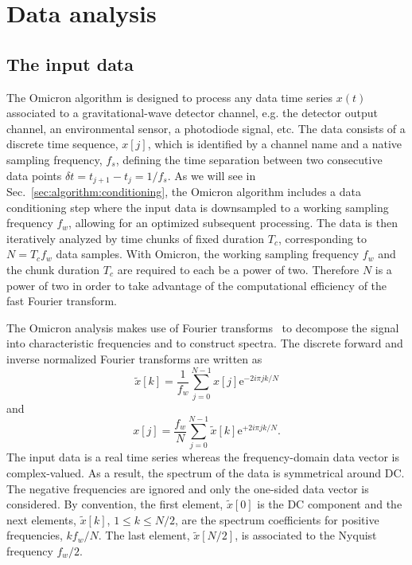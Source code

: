 \section{Data analysis} \label{sec:analysis}


\subsection{The input data} \label{sec:analysis:data}

The Omicron algorithm is designed to process any data time series $x(t)$ associated to a gravitational-wave detector channel, e.g. the detector output channel, an environmental sensor, a photodiode signal, etc. The data consists of a discrete time sequence, $x[j]$, which is identified by a channel name and a native sampling frequency, $f_s$, defining the time separation between two consecutive data points $\delta t = t_{j+1}-t_j = 1/f_s$. As we will see in Sec.~\ref{sec:algorithm:conditioning}, the Omicron algorithm includes a data conditioning step where the input data is downsampled to a working sampling frequency $f_w$, allowing for an optimized subsequent processing. The data is then iteratively analyzed by time chunks of fixed duration $T_c$, corresponding to $N=T_cf_w$ data samples. With Omicron, the working sampling frequency $f_w$ and the chunk duration $T_c$ are required to each be a power of two. Therefore $N$ is a power of two in order to take advantage of the computational efficiency of the fast Fourier transform.

The Omicron analysis makes use of Fourier transforms~\cite{Gabor:1946} to decompose the signal into characteristic frequencies and to construct spectra. The discrete forward and inverse normalized Fourier transforms are written as
\begin{equation}
  \tilde{x}[k]=\frac{1}{f_w}\sum_{j=0}^{N-1}{x[j]\mathrm{e}^{-2i\pi jk/N}}
\end{equation}
and
\begin{equation}
  x[j]=\frac{f_w}{N}\sum_{j=0}^{N-1}{\tilde{x}[k]\mathrm{e}^{+2i\pi jk/N}}.
\end{equation}
The input data is a real time series whereas the frequency-domain data vector is complex-valued. As a result, the spectrum of the data is symmetrical around DC. The negative frequencies are ignored and only the one-sided data vector is considered. By convention, the first element, $\tilde{x}[0]$ is the DC component and the next elements, $\tilde{x}[k]$, $1\le k \le N/2$, are the spectrum coefficients for positive frequencies, $kf_w/N$. The last element, $\tilde{x}[N/2]$, is associated to the Nyquist frequency $f_w/2$. 

